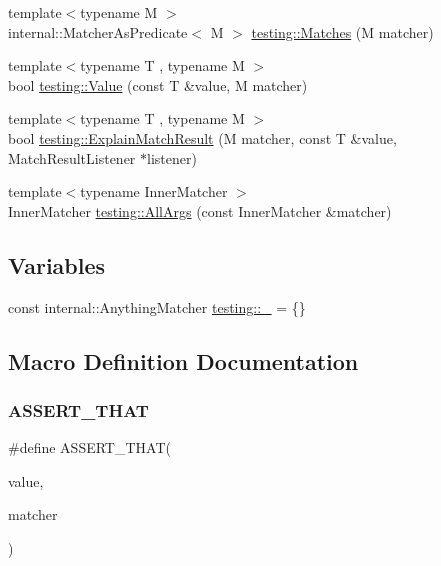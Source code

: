 \begin{DoxyCompactItemize}
\item 
{\footnotesize template$<$typename M $>$ }\\internal\+::\+Matcher\+As\+Predicate$<$ M $>$ \hyperlink{namespacetesting_ad53b509ae9cd51040d67f668f99702ae}{testing\+::\+Matches} (M matcher)
\item 
{\footnotesize template$<$typename T , typename M $>$ }\\bool \hyperlink{namespacetesting_ae44c50a3a7f0a46f05c8a0b0592b4a62}{testing\+::\+Value} (const T \&value, M matcher)
\item 
{\footnotesize template$<$typename T , typename M $>$ }\\bool \hyperlink{namespacetesting_a6d5fbd5104dafc63bf705dafbcb5ce18}{testing\+::\+Explain\+Match\+Result} (M matcher, const T \&value, Match\+Result\+Listener $\ast$listener)
\item 
{\footnotesize template$<$typename Inner\+Matcher $>$ }\\Inner\+Matcher \hyperlink{namespacetesting_a2522e94b71f88fbfbbcf6942cd0c6ee0}{testing\+::\+All\+Args} (const Inner\+Matcher \&matcher)
\end{DoxyCompactItemize}
\subsection*{Variables}
\begin{DoxyCompactItemize}
\item 
const internal\+::\+Anything\+Matcher \hyperlink{namespacetesting_a4ba77a3f5b67166ff1b59d96a32346a2}{testing\+::\+\_\+} = \{\}
\end{DoxyCompactItemize}


\subsection{Macro Definition Documentation}
\mbox{\label{gmock-matchers_8h_a41d888579850c16583baea33ee8d057e}} 
\subsubsection{\texorpdfstring{A\+S\+S\+E\+R\+T\+\_\+\+T\+H\+AT}{ASSERT\_THAT}}
{\footnotesize\ttfamily \#define A\+S\+S\+E\+R\+T\+\_\+\+T\+H\+AT(\begin{DoxyParamCaption}\item[{}]{value,  }\item[{}]{matcher }\end{DoxyParamCaption})}

